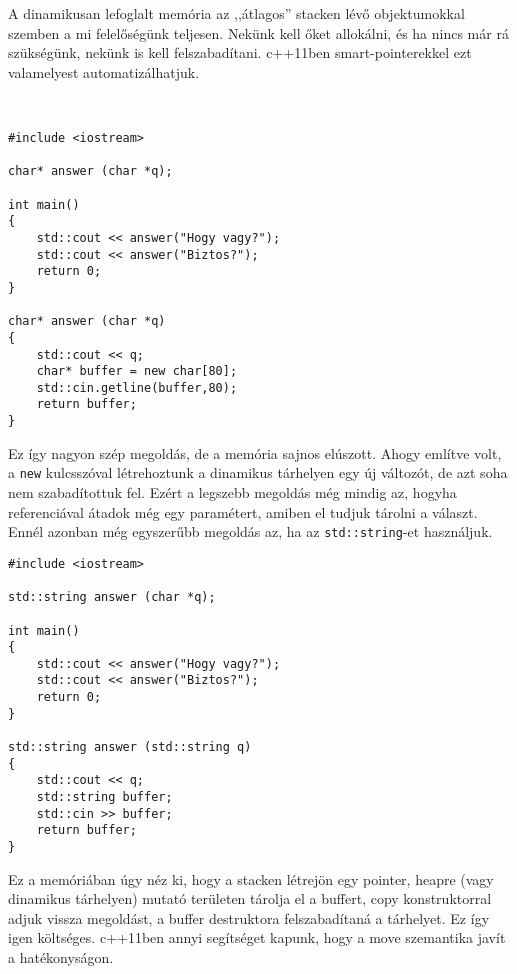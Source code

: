 \documentclass[a4paper,11.5pt]{article}
\begin{document}
	A dinamikusan lefoglalt memória az ,,átlagos'' stacken lévő objektumokkal szemben a mi felelőségünk teljesen. Nekünk kell őket allokálni, és ha nincs már rá szükségünk, nekünk is kell felszabadítani. c++11ben smart-pointerekkel ezt valamelyest automatizálhatjuk.
	\begin{example}\ 
		
		\begin{lstlisting}
#include <iostream>

char* answer (char *q);

int main()
{
	std::cout << answer("Hogy vagy?");
	std::cout << answer("Biztos?");
	return 0;
}

char* answer (char *q)
{
	std::cout << q;
	char* buffer = new char[80];
	std::cin.getline(buffer,80);
	return buffer;
}
		\end{lstlisting}
		Ez így nagyon szép megoldás, de a memória sajnos elúszott. Ahogy említve volt, a \texttt{new} kulcsszóval létrehoztunk a dinamikus tárhelyen egy új változót, de azt soha nem szabadítottuk fel. Ezért a legszebb megoldás még mindig az, hogyha referenciával átadok még egy paramétert, amiben el tudjuk tárolni a választ. Ennél azonban még egyszerűbb megoldás az, ha az \texttt{std::string}-et használjuk.
		\begin{lstlisting}
#include <iostream>

std::string answer (char *q);

int main()
{
	std::cout << answer("Hogy vagy?");
	std::cout << answer("Biztos?");
	return 0;
}

std::string answer (std::string q)
{
	std::cout << q;
	std::string buffer;
	std::cin >> buffer;
	return buffer;
}
		\end{lstlisting}
		
		Ez a memóriában úgy néz ki, hogy a stacken létrejön egy pointer, heapre (vagy dinamikus tárhelyen) mutató területen tárolja el a buffert, copy konstruktorral adjuk vissza megoldást, a buffer destruktora felszabadítaná a tárhelyet. Ez így igen költséges. c++11ben annyi segítséget kapunk, hogy a move szemantika javít a hatékonyságon.
	\end{example}
	
\end{document}
